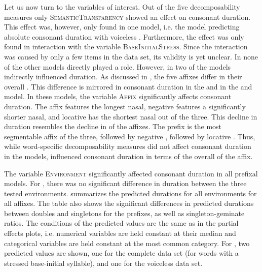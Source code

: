 Let us now turn to the variables of interest. Out of the five decomposability measures only \textsc{SemanticTransparency} showed an effect on consonant duration. This effect was, however, only found in one model, i.e. the model predicting absolute consonant duration with voiceless .  Furthermore, the effect was only found in interaction with the variable \textsc{BaseInitialStress}. Since the interaction was caused by only a few items in the data set, its validity is yet unclear. 
In none of the other models  directly played a role. 
However, in two of the models  indirectly influenced duration. As discussed in , the five affixes differ in their overall . This difference is mirrored in consonant duration in the  and in the  and  model. In these models, the variable \textsc{Affix} significantly affects consonant duration. The affix  features the longest nasal, negative  features a significantly shorter nasal, and locative  has the shortest nasal out of the three. This decline in duration resembles the decline in  of the affixes. The prefix  is the most segmentable affix of the three, followed by negative , followed by locative . Thus, while word-specific decomposability measures did not affect consonant duration in the models,  influenced consonant duration in terms of the overall  of the affix.\largerpage


The variable \textsc{Environment} significantly affected consonant duration in all prefixal models. For , there was no significant difference in duration between the three tested environments.
 summarizes the predicted durations for all environments for all affixes. The table also shows the significant differences in predicted durations between doubles and singletons for the prefixes, as well as singleton-geminate ratios.
The conditions of the predicted values are the same as in the partial effects plots, i.e. numerical variables are held constant at their median and categorical variables are held constant at the most common category. For , two predicted values are shown, one for the complete data set (for words with a stressed base-initial syllable), and one for the voiceless data set.







